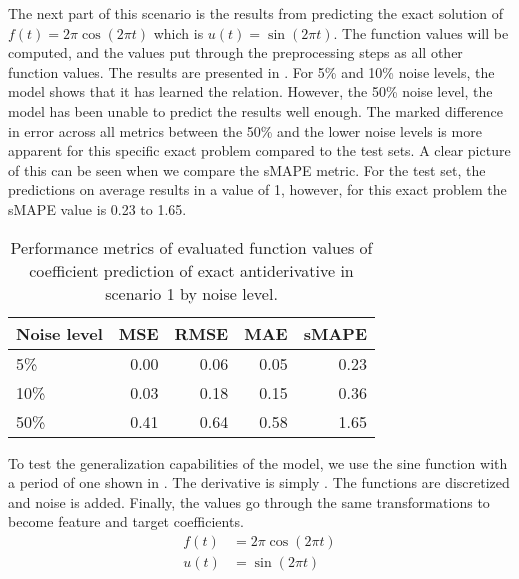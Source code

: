 \documentclass[preprint,12pt,times,authoryear]{elsarticle}
\begin{document}
The next part of this scenario is the results from predicting the exact solution of \(f(t)=2\pi\cos(2\pi t)\) which is \(u(t)=\sin(2\pi t)\). The function values will be computed, and the values put through the preprocessing steps as all other function values. The results are presented in . For 5\% and 10\% noise levels, the model shows that it has learned the relation. However, the 50\% noise level, the model has been unable to predict the results well enough. The marked difference in error across all metrics between the 50\% and the lower noise levels is more apparent for this specific exact problem compared to the test sets. A clear picture of this can be seen when we compare the sMAPE metric. For the test set, the predictions on average results in a value of 1, however, for this exact problem the sMAPE value is 0.23 to 1.65.
\begin{table}[H]
  \caption{Performance metrics of evaluated function values of coefficient prediction of exact antiderivative in scenario 1 by noise level.}\label{table:scenario_1_exact_function_metrics}
  \centering
  \begin{tabular}{lrrrr}
    \toprule
    Noise level & MSE  & RMSE & MAE  & sMAPE \\
    \midrule
    5\%         & 0.00 & 0.06 & 0.05 & 0.23  \\
    10\%        & 0.03 & 0.18 & 0.15 & 0.36  \\
    50\%        & 0.41 & 0.64 & 0.58 & 1.65  \\
    \bottomrule
  \end{tabular}
\end{table}

To test the generalization capabilities of the model, we use the sine function with a period of one shown in . The derivative is simply . The functions are discretized and noise is added. Finally, the values go through the same transformations to become feature and target coefficients.
\begin{align}
  f(t) & = 2\pi \cos\left(2\pi t\right)\label{eq:sine_derivative} \\
  u(t) & = \sin\left(2\pi t\right)\label{eq:sine_function}
\end{align}
\end{document}
